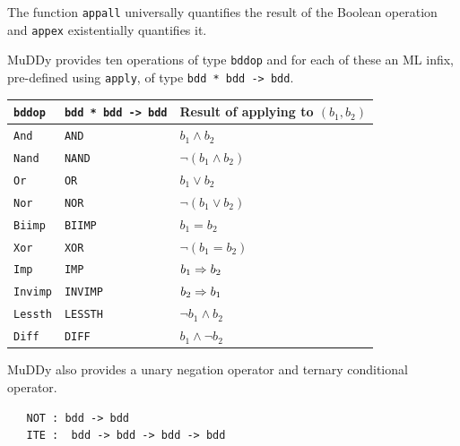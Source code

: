 \documentclass[12pt,fleqn]{article}
\renewcommand{\t}[1]{\mbox{\tt #1}}
\newcommand{\Muddy}{MuDDy{}}
\begin{document}
The function \t{appall} universally quantifies the result of the
Boolean operation and \t{appex} existentially quantifies it.

\Muddy{} provides ten operations of type \t{bddop} and for each of
these an ML infix, pre-defined using \t{apply}, of type \t{bdd~*~bdd~->~bdd}.



\begin{center}

\begin{tabular}{|l||l|l|} \hline
\t{bddop}\index{HolBddLib!ML bindings!{bddop}@\ml{bddop}} & \t{bdd~*~bdd~->~bdd} & Result of applying to $(b_1,b_2)$\\ \hline\hline
\t{And}\index{HolBddLib!ML bindings!{And}@\ml{And}} & \t{AND} & $b_1\wedge b_2$ \\ \hline
\t{Nand}\index{HolBddLib!ML bindings!{Nand}@\ml{Nand}} & \t{NAND} & $\neg(b_1\wedge b_2)$ \\ \hline
\t{Or}\index{HolBddLib!ML bindings!{Or}@\ml{Or}}  & \t{OR} & $b_1\vee b_2$ \\ \hline
\t{Nor}\index{HolBddLib!ML bindings!{Nor}@\ml{Nor}} & \t{NOR} & $\neg(b_1\vee b_2)$ \\ \hline
\t{Biimp}\index{HolBddLib!ML bindings!{Biimp}@\ml{Biimp}} & \t{BIIMP} & $b_1= b_2$ \\ \hline
\t{Xor}\index{HolBddLib!ML bindings!{Xor}@\ml{Xor}} & \t{XOR} & $\neg(b_1=b_2)$ \\ \hline
\t{Imp}\index{HolBddLib!ML bindings!{Imp}@\ml{Imp}} & \t{IMP} & $b_1\Rightarrow b_2$ \\ \hline
\t{Invimp}\index{HolBddLib!ML bindings!{Invimp}@\ml{Invimp}} & \t{INVIMP} & $b_2\Rightarrow b_1$ \\ \hline
\t{Lessth}\index{HolBddLib!ML bindings!{Lessth}@\ml{Lessth}} & \t{LESSTH} & $\neg b_1\wedge b_2$ \\ \hline
\t{Diff}\index{HolBddLib!ML bindings!{Diff}@\ml{Diff}} & \t{DIFF} & $b_1\wedge \neg b_2$ \\ \hline
\end{tabular}\label{bddops}

\end{center}

\Muddy{} also provides a unary negation operator and ternary conditional operator.

\begin{verbatim}
   NOT : bdd -> bdd
   ITE :  bdd -> bdd -> bdd -> bdd
\end{verbatim}
\end{document}
